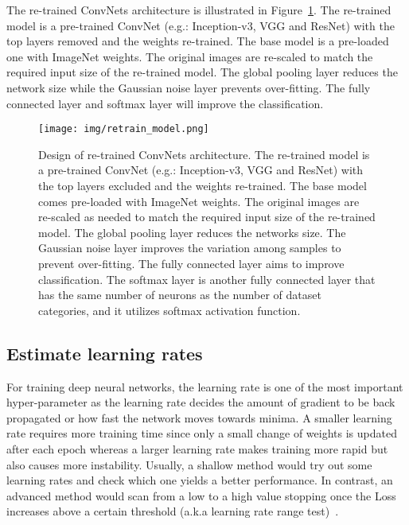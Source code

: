 \documentclass{ieeeaccess}
\begin{document}
The re-trained ConvNets architecture is illustrated in Figure~\ref{fig:retrain_model}. The re-trained model is a pre-trained ConvNet (e.g.: Inception-v3, VGG and ResNet) with the top layers removed and the weights re-trained. The base model is a pre-loaded one with ImageNet weights. The original images are re-scaled to match the required input size of the re-trained model. The global pooling layer reduces the network size while the Gaussian noise layer prevents over-fitting. The fully connected layer and softmax layer will improve the classification.
\begin{figure}[htbp!]
\begin{center}
\texttt{[image: img/retrain\_model.png]}
\caption{Design of re-trained ConvNets architecture. The re-trained model is a pre-trained ConvNet (e.g.: Inception-v3, VGG and ResNet) with the top layers excluded and the weights re-trained. The base model comes pre-loaded with ImageNet weights. The original images are re-scaled as needed to match the required input size of the re-trained model. The global pooling layer reduces the networks size. The Gaussian noise layer improves the variation among samples to prevent over-fitting. The fully connected layer aims to improve classification. The softmax layer is another fully connected layer that has the same number of neurons as the number of dataset categories, and it utilizes softmax activation function.}
\label{fig:retrain_model}
\end{center}
\end{figure}
\subsection{Estimate learning rates}
\label{experiments0}
For training deep neural networks, the learning rate is one of the most important hyper-parameter as the learning rate decides the amount of gradient to be back propagated or how fast the network moves towards minima. A smaller learning rate requires more training time since only a small change of weights is updated after each epoch whereas a larger learning rate makes training more rapid but also causes more instability. Usually, a shallow method would try out some learning rates and check which one yields a better performance. In contrast, an advanced method would scan from a low to a high value stopping once the Loss increases above a certain threshold (a.k.a learning rate range test)~\cite{smith2017cyclical}.
\end{document}
